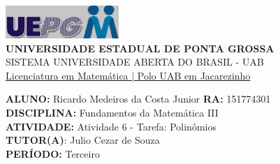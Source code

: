 \documentclass[a4paper, 12pt]{article}
\begin{document}
\begin{flushleft}\includegraphics{logo}\\
\textbf{UNIVERSIDADE ESTADUAL DE PONTA GROSSA} \\
SISTEMA UNIVERSIDADE ABERTA DO BRASIL - UAB \\
\underline{Licenciatura em Matemática | Polo UAB em Jacarezinho}\end{flushleft} 
\textbf{ALUNO:} Ricardo Medeiros da Costa Junior   \textbf{RA:} 151774301 \\
\textbf{DISCIPLINA:} Fundamentos da Matemática III \\
\textbf{ATIVIDADE:} Atividade 6 - Tarefa: Polinômios\\
\textbf{TUTOR(A)}: Julio Cezar de Souza\\
\textbf{PERÍODO:} Terceiro\\
\end{document}
